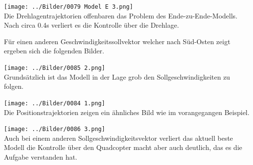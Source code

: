 \begin{center}
	\texttt{[image: ../Bilder/0079 Model E 3.png]}{\\Die Drehlagentrajektorien offenbaren das Problem des Ende-zu-Ende-Modells. Nach circa 0.4s verliert es die Kontrolle über die Drehlage.}
\end{center}
Für einen anderen Geschwindigkeitssollvektor welcher nach Süd-Osten zeigt ergeben sich die folgenden Bilder.
\begin{center}
	\texttt{[image: ../Bilder/0085 2.png]}{\\Grundsätzlich ist das Modell in der Lage grob den Sollgeschwindigkeiten zu folgen.}
\end{center}
\begin{center}
	\texttt{[image: ../Bilder/0084 1.png]}{\\Die Positionstrajektorien zeigen ein ähnliches Bild wie im vorangegangen Beispiel.}
\end{center}
\begin{center}
	\texttt{[image: ../Bilder/0086 3.png]}{\\Auch bei einem anderen Sollgeschwindigkeitsvektor verliert das aktuell beste Modell die Kontrolle über den Quadcopter macht aber auch deutlich, das es die Aufgabe verstanden hat.}
\end{center}

